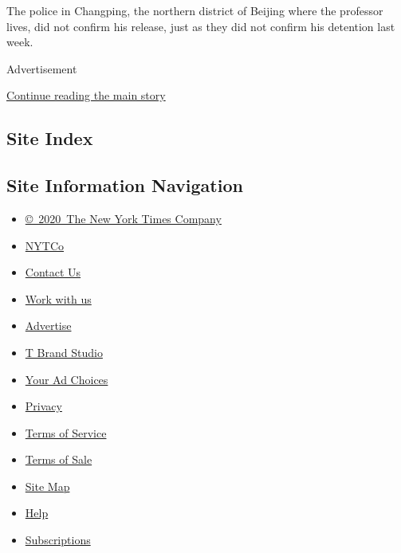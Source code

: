 The police in Changping, the northern district of Beijing where the
professor lives, did not confirm his release, just as they did not
confirm his detention last week.

Advertisement

\protect\hyperlink{after-bottom}{Continue reading the main story}

\hypertarget{site-index}{%
\subsection{Site Index}\label{site-index}}

\hypertarget{site-information-navigation}{%
\subsection{Site Information
Navigation}\label{site-information-navigation}}

\begin{itemize}
\tightlist
\item
  \href{https://help.nytimes.com/hc/en-us/articles/115014792127-Copyright-notice}{©~2020~The
  New York Times Company}
\end{itemize}

\begin{itemize}
\tightlist
\item
  \href{https://www.nytco.com/}{NYTCo}
\item
  \href{https://help.nytimes.com/hc/en-us/articles/115015385887-Contact-Us}{Contact
  Us}
\item
  \href{https://www.nytco.com/careers/}{Work with us}
\item
  \href{https://nytmediakit.com/}{Advertise}
\item
  \href{http://www.tbrandstudio.com/}{T Brand Studio}
\item
  \href{https://www.nytimes.com/privacy/cookie-policy\#how-do-i-manage-trackers}{Your
  Ad Choices}
\item
  \href{https://www.nytimes.com/privacy}{Privacy}
\item
  \href{https://help.nytimes.com/hc/en-us/articles/115014893428-Terms-of-service}{Terms
  of Service}
\item
  \href{https://help.nytimes.com/hc/en-us/articles/115014893968-Terms-of-sale}{Terms
  of Sale}
\item
  \href{https://spiderbites.nytimes.com}{Site Map}
\item
  \href{https://help.nytimes.com/hc/en-us}{Help}
\item
  \href{https://www.nytimes.com/subscription?campaignId=37WXW}{Subscriptions}
\end{itemize}
